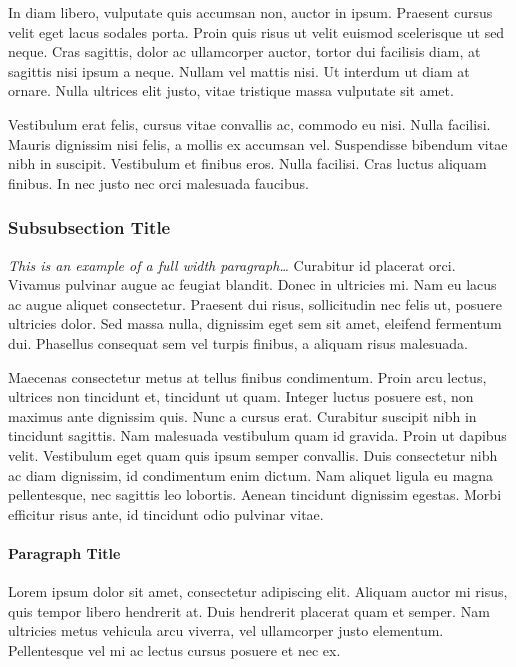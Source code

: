 \documentclass[
	a4paper, %
	12pt, %
]{include/CSSullivanBusinessReport}
\begin{document}
In diam libero, vulputate quis accumsan non, auctor in ipsum. Praesent cursus velit eget lacus sodales porta. Proin quis risus ut velit euismod scelerisque ut sed neque. Cras sagittis, dolor ac ullamcorper auctor, tortor dui facilisis diam, at sagittis nisi ipsum a neque. Nullam vel mattis nisi. Ut interdum ut diam at ornare. Nulla ultrices elit justo, vitae tristique massa vulputate sit amet.

\nonumsidenote{
	}Vestibulum erat felis, cursus vitae convallis ac, commodo eu nisi. Nulla facilisi. Mauris dignissim nisi felis, a mollis ex accumsan vel. Suspendisse bibendum vitae nibh in suscipit. Vestibulum et finibus eros. Nulla facilisi. Cras luctus aliquam finibus. In nec justo nec orci malesuada faucibus.

\subsubsection{Subsubsection Title} %

\begin{fullwidth} %
	\textit{This is an example of a full width paragraph\ldots} Curabitur id placerat orci. Vivamus pulvinar augue ac feugiat blandit. Donec in ultricies mi. Nam eu lacus ac augue aliquet consectetur. Praesent dui risus, sollicitudin nec felis ut, posuere ultricies dolor. Sed massa nulla, dignissim eget sem sit amet, eleifend fermentum dui. Phasellus consequat sem vel turpis finibus, a aliquam risus malesuada.
\end{fullwidth}

Maecenas consectetur metus at tellus finibus condimentum. Proin arcu lectus, ultrices non tincidunt et, tincidunt ut quam. Integer luctus posuere est, non maximus ante dignissim quis. Nunc a cursus erat. Curabitur suscipit nibh in tincidunt sagittis. Nam malesuada vestibulum quam id gravida. Proin ut dapibus velit. Vestibulum eget quam quis ipsum semper convallis. Duis consectetur nibh ac diam dignissim, id condimentum enim dictum. Nam aliquet ligula eu magna pellentesque, nec sagittis leo lobortis. Aenean tincidunt dignissim egestas. Morbi efficitur risus ante, id tincidunt odio pulvinar vitae.

\paragraph{Paragraph Title} %

Lorem ipsum dolor sit amet, consectetur adipiscing elit. Aliquam auctor mi risus, quis tempor libero hendrerit at. Duis hendrerit placerat quam et semper. Nam ultricies metus vehicula arcu viverra, vel ullamcorper justo elementum. Pellentesque vel mi ac lectus cursus posuere et nec ex.
\end{document}
